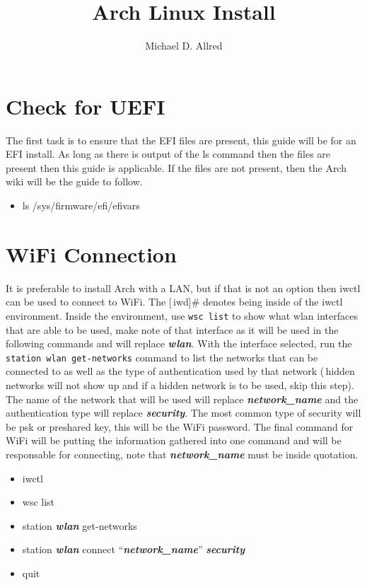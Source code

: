 \documentclass[10pt,letterpaper]{article}
\title{Arch Linux Install}
\author{Michael D. Allred}
\begin{document}
\maketitle

\section{Check for UEFI}

The first task is to ensure that the EFI files are present, this guide will be
for an EFI install. As long as there is output of the ls command then the files
are present then this guide is applicable. If the files are not present, then
the Arch wiki will be the guide to follow.
\begin{itemize}[noitemsep]
    \item ls /sys/firmware/efi/efivars
\end{itemize}

\section{WiFi Connection}

It is preferable to install Arch with a LAN, but if that is not an option then
iwctl can be used to connect to WiFi. The [\,iwd]\# denotes being inside of the
iwctl environment. Inside the environment, use \texttt{wsc list} to show what
wlan interfaces that are able to be used, make note of that interface as it
will be used in the following commands and will replace \textbf{\textit{wlan}}.
With the interface selected, run the \texttt{station wlan get-networks} command
to list the networks that can be connected to as well as the type of
authentication used by that network (\,hidden networks will not show up and if
a hidden network is to be used, skip this step). The name of the network that
will be used will replace \textbf{\textit{network\_name}} and the
authentication type will replace \textbf{\textit{security}}. The most common
type of security will be psk or preshared key, this will be the WiFi password.
The final command for WiFi will be putting the information gathered into one
command and will be responsable for connecting, note that
\textbf{\textit{network\_name}} must be inside quotation.
\begin{itemize}[noitemsep]
    \item iwctl
    \item wsc list
    \item station \textbf{\textit{wlan}} get-networks
    \item station \textbf{\textit{wlan}} connect ``\textbf{\textit{network\_name}}'' \textbf{\textit{security}}
    \item quit
\end{itemize}
\end{document}
